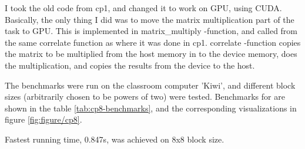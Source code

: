 I took the old code from cp1, and changed it to work on GPU, using CUDA. Basically, the only thing I did was to move the matrix multiplication part of the task to GPU. This is implemented in matrix\_multiply -function, and called from the same correlate function as where it was done in cp1. correlate -function copies the matrix to be multiplied from the host memory in to the device memory, does the multiplication, and copies the results from the device to the host.

The benchmarks were run on the classroom computer 'Kiwi', and different block sizes (arbitrarily chosen to be powers of two) were tested. Benchmarks for are shown in the table \ref{tab:cp8-benchmarks}, and the corresponding visualizations in figure \ref{fig:figure/cp8}.

Fastest running time, 0.847s, was achieved on 8x8 block size.

